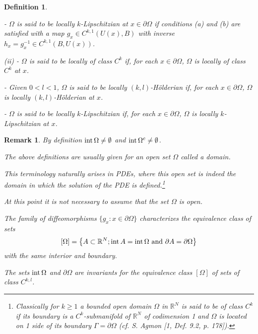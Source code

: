\documentclass{book}
\numberwithin{equation}{section}
\newtheorem{definition}{Definition}[section]
\newtheorem{remark}{Remark}[section]
\begin{document}
\begin{enumerate}
\begin{definition}
\begin{itemize}
            - $\Omega$ is said to be \emph{locally $k$-Lipschitzian at} $x\in\partial\Omega$ if conditions (a) and (b) are satisfied with a map $g_x\in C^{k,1}\left(U(x),B\right)$ with inverse $h_x = g_x^{-1}\in C^{k,1}\left(B,U(x)\right)$.
        \end{itemize}
        \item[(ii)] - $\Omega$ is said to be \emph{locally of class} $C^k$ if, for each $x\in\partial\Omega$, $\Omega$ is locally of \emph{class} $C^k$ at $x$.
        
        - Given $0 < l < 1$, $\Omega$ is said to be \emph{locally $(k,l)$-Hölderian} if, for each $x\in\partial\Omega$, $\Omega$ is locally $(k,l)$-Hölderian at $x$.
        
        - $\Omega$ is said to be \emph{locally $k$-Lipschitzian} if, for each $x\in\partial\Omega$, $\Omega$ is locally $k$-Lipschitzian at $x$.
    \end{definition}

    \begin{remark}
        By definition ${\rm int}\,\Omega\ne\emptyset$ and ${\rm int}\,\Omega^c\ne\emptyset$.
        
        The above definitions are usually given for an open set $\Omega$ called a \emph{domain}.
        
        This terminology naturally arises in PDEs, where this open set is indeed the \emph{domain} in which the solution of the PDE is defined.\footnote{Classically for $k\ge 1$ a bounded open domain $\Omega$ in $\mathbb{R}^N$ is said to be of class $C^k$ if its boundary is a $C^k$-submanifold of $\mathbb{R}^N$ of codimension 1 and $\Omega$ is located on 1 side of its boundary $\Gamma = \partial\Omega$ (cf. S. Agmon [1, Def. 9.2, p. 178]).}
        
        At this point it is not necessary to assume that the set $\Omega$ is open.
        
        The family of diffeomorphisms $\{g_x:x\in\partial\Omega\}$ characterizes the equivalence class of sets
        \begin{align*}
            \left[\Omega\right] = \left\{A\subset\mathbb{R}^N;{\rm int}\,A = {\rm int}\,\Omega \mbox{ and } \partial A = \partial\Omega\right\}
        \end{align*}
        with the same interior and boundary.
        
        The sets ${\rm int}\,\Omega$ and $\partial\Omega$ are invariants for the equivalence class $[\Omega]$ of sets of class $C^{k,l}$.
        

\end{remark}
\end{enumerate}
\end{document}

